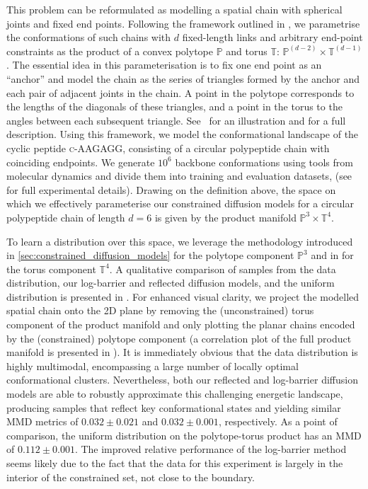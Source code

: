 This problem can be reformulated as modelling a spatial chain with spherical joints and fixed end points.
Following the framework outlined in \textcite{han2006inverse}, we parametrise the conformations of such chains with $d$ fixed-length links and arbitrary end-point constraints as the product of a convex polytope $\mathbb{P}$ and torus $\mathbb{T}$: $\mathbb{P}^{(d-2)} \times \mathbb{T}^{(d-1)}$.
The essential idea in this parameterisation is to fix one end point as an ``anchor'' and model the chain as the series of triangles formed by the anchor and each pair of adjacent joints in the chain.
A point in the polytope corresponds to the lengths of the diagonals of these triangles, and a point in the torus to the angles between each subsequent triangle.
See~ for an illustration and  for a full description.
Using this framework, we model the conformational landscape of the cyclic peptide \textsc{c-AAGAGG}, consisting of a circular polypeptide chain with coinciding endpoints.
We generate $10^6$ backbone conformations using tools from molecular dynamics \parencite{eastman2017openmm, hornak2006comparison} and divide them into training and evaluation datasets, (see~ for full experimental details).
Drawing on the definition above, the space on which we effectively parameterise our constrained diffusion models for a circular polypeptide chain of length $d=6$ is given by the product manifold $\mathbb{P}^3 \times \mathbb{T}^4$.

To learn a distribution over this space, we leverage the methodology introduced in \cref{sec:constrained_diffusion_models} for the polytope component $\mathbb{P}^3$ and in \textcite{de2022riemannian} for the torus component $\mathbb{T}^4$.
A qualitative comparison of samples from the data distribution, our log-barrier and reflected diffusion models, and the uniform distribution is presented in .
For enhanced visual clarity, we project the modelled spatial chain onto the 2D plane by removing the (unconstrained) torus component of the product manifold and only plotting the planar chains encoded by the (constrained) polytope component (a correlation plot of the full product manifold is presented in ).
It is immediately obvious that the data distribution is highly multimodal, encompassing a large number of locally optimal conformational clusters.
Nevertheless, both our reflected and log-barrier diffusion models are able to robustly approximate this challenging energetic landscape, producing samples that reflect key conformational states and yielding similar \textsc{MMD} metrics of $0.032\pm{0.021}$ and $0.032\pm{0.001}$, respectively.
As a point of comparison, the uniform distribution on the polytope-torus product has an \textsc{MMD} of $0.112 \pm{0.001}$.
The improved relative performance of the log-barrier method seems likely due to the fact that the data for this experiment is largely in the interior of the constrained set, not close to the boundary.

